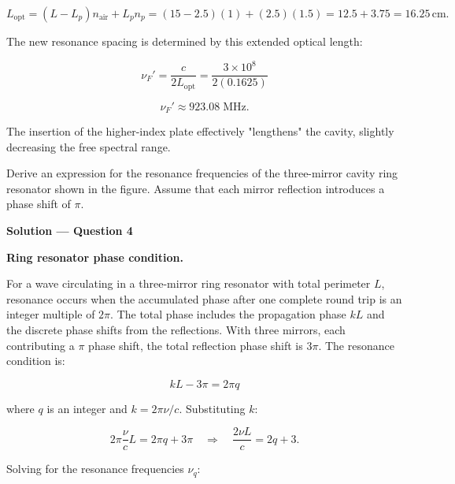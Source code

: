 \begin{equation*}
  L_{\text{opt}} = (L - L_p)n_{\text{air}} + L_p n_p = (15 - 2.5)(1) + (2.5)(1.5) = 12.5 + 3.75 = 16.25\,\text{cm}.
\end{equation*}

The new resonance spacing is determined by this extended optical length:

\begin{equation*}
  \nu_F' = \frac{c}{2L_{\text{opt}}} = \frac{3\times10^{8}}{2(0.1625)}
\end{equation*}

\begin{equation*}
  \boxed{\nu_F' \approx 923.08\;\text{MHz}.}
\end{equation*}

The insertion of the higher-index plate effectively "lengthens" the cavity, slightly decreasing the free spectral range.


\begin{question}[Question 4]Derive an expression for the resonance frequencies of the three-mirror
cavity ring resonator shown in the figure. Assume that each mirror reflection introduces a phase
shift of $\pi$.
\end{question}

\textbf{\large Solution --- Question 4}

\textbf{Ring resonator phase condition.}

For a wave circulating in a three-mirror ring resonator with total perimeter $L$, resonance occurs when the accumulated phase after one complete round trip is an integer multiple of $2\pi$. The total phase includes the propagation phase $kL$ and the discrete phase shifts from the reflections.
With three mirrors, each contributing a $\pi$ phase shift, the total reflection phase shift is $3\pi$. The resonance condition is:

\begin{equation*}
  kL - 3\pi = 2\pi q
\end{equation*}

where $q$ is an integer and $k = 2\pi\nu/c$. Substituting $k$:

\begin{equation*}
  2\pi\frac{\nu}{c}L = 2\pi q + 3\pi \quad\Longrightarrow\quad \frac{2\nu L}{c} = 2q + 3.
\end{equation*}

Solving for the resonance frequencies $\nu_q$:

